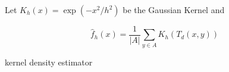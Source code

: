 Let  $K_h(x) = \exp( -x^2/h^2)$ be the Gaussian Kernel and

\[   \hat{f}_h(x) = \frac{1}{|A|}\sum_{ y \in A} K_h (T_d(x,y))  \]

 kernel density estimator

